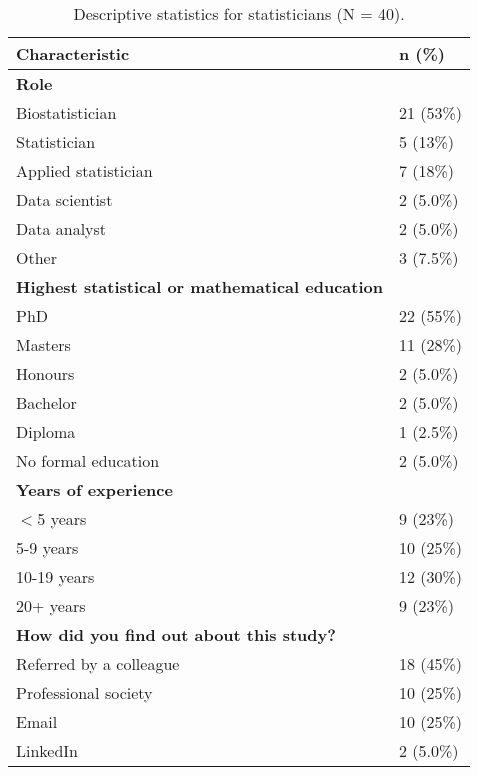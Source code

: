 \begin{table}[H]

\caption{Descriptive statistics for statisticians (N = 40).} 
\begin{tabular}{ll}
  \toprule
{\bf Characteristic} & {\bf n (\%) } \\ 
  \midrule
\textbf {Role} &  \\ 
  Biostatistician & 21 (53\%) \\ 
  Statistician & 5 (13\%) \\ 
  Applied statistician & 7 (18\%) \\ 
  Data scientist & 2 (5.0\%) \\ 
  Data analyst & 2 (5.0\%) \\ 
  Other & 3 (7.5\%) \\ 
  \textbf {Highest statistical or mathematical education} &  \\ 
  PhD & 22 (55\%) \\ 
  Masters & 11 (28\%) \\ 
  Honours & 2 (5.0\%) \\ 
  Bachelor & 2 (5.0\%) \\ 
  Diploma & 1 (2.5\%) \\ 
  No formal education & 2 (5.0\%) \\ 
  \textbf {Years of experience} &  \\ 
  $<$5 years & 9 (23\%) \\ 
  5-9 years & 10 (25\%) \\ 
  10-19 years & 12 (30\%) \\ 
  20+ years & 9 (23\%) \\ 
  \textbf {How did you find out about this study?} &  \\ 
  Referred by a colleague & 18 (45\%) \\ 
  Professional society & 10 (25\%) \\ 
  Email & 10 (25\%) \\ 
  LinkedIn & 2 (5.0\%) \\ 
   \bottomrule
\end{tabular}
\end{table}

